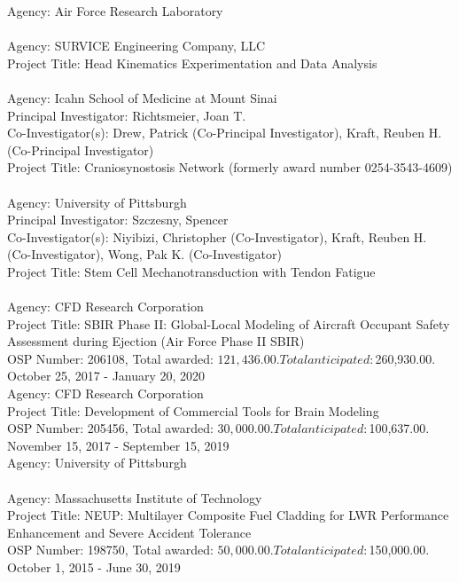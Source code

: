 \documentclass[a4paper,10pt]{article}
\begin{document}
Agency: Air Force Research Laboratory\\
\\[12pt]
Agency: SURVICE Engineering Company, LLC\\
Project Title: Head Kinematics Experimentation and Data Analysis\\
\\[12pt]
Agency: Icahn School of Medicine at Mount Sinai\\
Principal Investigator: Richtsmeier, Joan T.\\
Co-Investigator(s): Drew, Patrick (Co-Principal Investigator), Kraft, Reuben H. (Co-Principal Investigator)\\
Project Title: Craniosynostosis Network (formerly award number 0254-3543-4609)\\
\\[12pt]
Agency: University of Pittsburgh\\
Principal Investigator: Szczesny, Spencer\\
Co-Investigator(s): Niyibizi, Christopher (Co-Investigator), Kraft, Reuben H. (Co-Investigator), Wong, Pak K. (Co-Investigator)\\
Project Title: Stem Cell Mechanotransduction with Tendon Fatigue\\
\\[12pt]
Agency: CFD Research Corporation\\
Project Title: SBIR Phase II:    Global-Local Modeling of Aircraft Occupant Safety Assessment during Ejection (Air Force Phase II SBIR)\\
OSP Number: 206108, Total awarded: $121,436.00. Total anticipated: $260,930.00. October 25, 2017 - January 20, 2020\\
Agency: CFD Research Corporation\\
Project Title: Development of Commercial Tools for Brain Modeling\\
OSP Number: 205456, Total awarded: $30,000.00. Total anticipated: $100,637.00. November 15, 2017 - September 15, 2019\\
Agency: University of Pittsburgh\\
\\[12pt]
Agency: Massachusetts Institute of Technology\\
Project Title: NEUP: Multilayer Composite Fuel Cladding for LWR Performance Enhancement and Severe Accident Tolerance\\
OSP Number: 198750, Total awarded: $50,000.00. Total anticipated: $150,000.00. October 1, 2015 - June 30, 2019\\
\end{document}
